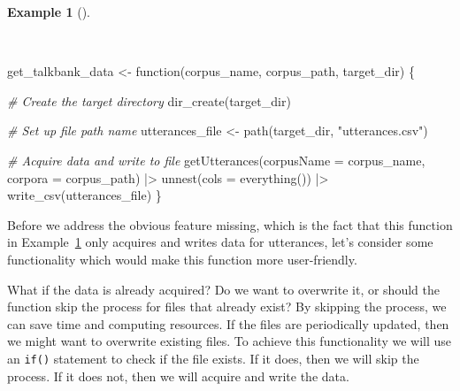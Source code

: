\documentclass[
  letterpaper,
  DIV=11,
  numbers=noendperiod]{scrreport}
\newenvironment{Shaded}{\begin{snugshade}}{\end{snugshade}}
\newcommand{\AttributeTok}[1]{\textcolor[rgb]{0.00,0.00,0.00}{#1}}
\newcommand{\CommentTok}[1]{\textcolor[rgb]{0.00,0.00,0.00}{\textit{#1}}}
\newcommand{\ControlFlowTok}[1]{\textcolor[rgb]{0.00,0.00,0.00}{#1}}
\newcommand{\FunctionTok}[1]{\textcolor[rgb]{0.00,0.00,0.00}{#1}}
\newcommand{\NormalTok}[1]{\textcolor[rgb]{0.00,0.00,0.00}{#1}}
\newcommand{\OtherTok}[1]{\textcolor[rgb]{0.00,0.00,0.00}{#1}}
\newcommand{\SpecialCharTok}[1]{\textcolor[rgb]{0.00,0.00,0.00}{#1}}
\newcommand{\StringTok}[1]{\textcolor[rgb]{0.00,0.00,0.00}{#1}}
\theoremstyle{definition}
\newtheorem{example}{Example}[chapter]
\theoremstyle{remark}
\begin{document}
\begin{example}[]\protect\hypertarget{exm-ad-get-talkbank-data-2}{}\label{exm-ad-get-talkbank-data-2}

~

\begin{Shaded}
\begin{Highlighting}[]
\NormalTok{get\_talkbank\_data }\OtherTok{\textless{}{-}} \ControlFlowTok{function}\NormalTok{(corpus\_name, corpus\_path, target\_dir) \{}
  
  \CommentTok{\# Create the target directory}
  \FunctionTok{dir\_create}\NormalTok{(target\_dir)}

  \CommentTok{\# Set up file path name}
\NormalTok{  utterances\_file  }\OtherTok{\textless{}{-}} \FunctionTok{path}\NormalTok{(target\_dir, }\StringTok{"utterances.csv"}\NormalTok{)}
  
  \CommentTok{\# Acquire data and write to file}
  \FunctionTok{getUtterances}\NormalTok{(}\AttributeTok{corpusName =}\NormalTok{ corpus\_name, }\AttributeTok{corpora =}\NormalTok{ corpus\_path) }\SpecialCharTok{|\textgreater{}} 
    \FunctionTok{unnest}\NormalTok{(}\AttributeTok{cols =} \FunctionTok{everything}\NormalTok{()) }\SpecialCharTok{|\textgreater{}} 
    \FunctionTok{write\_csv}\NormalTok{(utterances\_file)}
\NormalTok{\}}
\end{Highlighting}
\end{Shaded}

\end{example}

Before we address the obvious feature missing, which is the fact that
this function in Example~\ref{exm-ad-get-talkbank-data-2} only acquires
and writes data for utterances, let's consider some functionality which
would make this function more user-friendly.

What if the data is already acquired? Do we want to overwrite it, or
should the function skip the process for files that already exist? By
skipping the process, we can save time and computing resources. If the
files are periodically updated, then we might want to overwrite existing
files. To achieve this functionality we will use an \texttt{if()}
statement to check if the file exists. If it does, then we will skip the
process. If it does not, then we will acquire and write the data.
\end{document}
